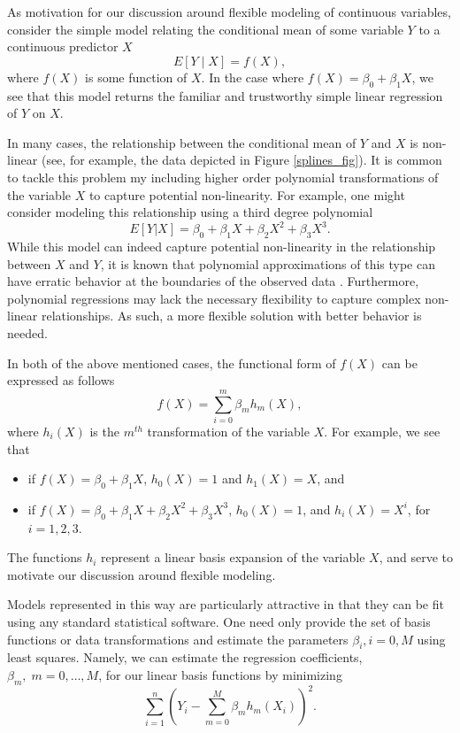 As motivation for our discussion around flexible modeling of continuous variables, consider the simple model relating the conditional mean of some variable $Y$ to a continuous predictor $X$
	\[E[Y \mid X] = f(X),\]
where $f(X)$ is some function of $X$. In the case where $f(X) = \beta_0 + \beta_1 X$, we see that this model returns the familiar and trustworthy simple linear regression of $Y$ on $X$. 

In many cases, the relationship between the conditional mean of $Y$ and $X$ is non-linear (see, for example, the data depicted in Figure \ref{splines_fig}). It is common to tackle this problem my including higher order polynomial transformations of the variable $X$ to capture potential non-linearity. For example, one might consider modeling this relationship using a third degree polynomial
	\[E[Y|X] = \beta_0 + \beta_1 X + \beta_2 X^2 + \beta_3 X^3.\]
While this model can indeed capture potential non-linearity in the relationship between $X$ and $Y$, it is known that polynomial approximations of this type can have erratic behavior at the boundaries of the observed data \cite{ESL}. Furthermore, polynomial regressions may lack the necessary flexibility to capture complex non-linear relationships. As such, a more flexible solution with better behavior is needed.

In both of the above mentioned cases, the functional form of $f(X)$ can be expressed as follows
	\[f(X) = \sum_{i=0}^m\beta_m h_m(X),\]
where $h_i(X)$ is the $m^{th}$ transformation of the variable $X$. For example, we see that
	\begin{itemize}
		\item if $f(X) = \beta_0 + \beta_1 X$, $h_0(X)=1$ and $h_1(X) = X$, and
		\item if $f(X) = \beta_0 + \beta_1 X + \beta_2 X^2 + \beta_3 X^3$, $h_0(X) = 1$, and $h_i(X) = X^i$, for $i=1,2,3$.
	\end{itemize}
The functions $h_i$ represent a linear basis expansion of the variable $X$, and serve to motivate our discussion around flexible modeling. 

Models represented in this way are particularly attractive in that they can be fit using any standard statistical software. One need only provide the set of basis functions or data transformations and estimate the parameters $\beta_i, i=0, M$ using least squares. Namely, we can estimate the regression coefficients, $\beta_m,\; m=0, \dots, M$, for our linear basis functions by minimizing 
	\[\sum_{i=1}^n \left(Y_i - \sum_{m=0}^M \beta_mh_m(X_i)\right)^2.\]

